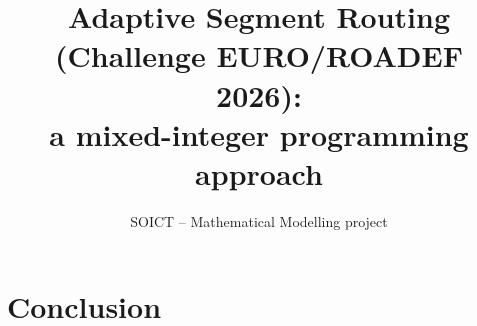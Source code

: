 \documentclass[11pt,a4paper]{article}
\title{Adaptive Segment Routing (Challenge EURO/ROADEF 2026):\\ a mixed-integer programming approach}
\author{SOICT -- Mathematical Modelling project}
\date{}
\begin{document}
\maketitle





\section{Conclusion}
\end{document}
